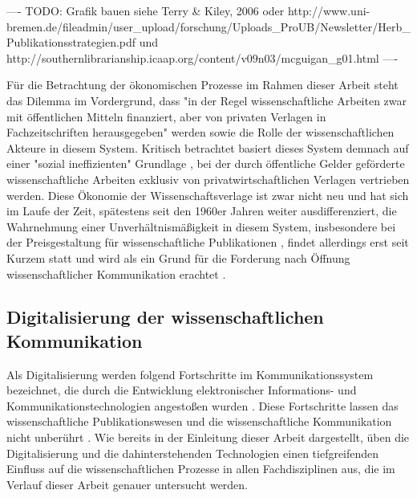 ---- TODO: Grafik bauen siehe Terry & Kiley, 2006 oder http://www.uni-bremen.de/fileadmin/user_upload/forschung/Uploads_ProUB/Newsletter/Herb_Publikationsstrategien.pdf und http://southernlibrarianship.icaap.org/content/v09n03/mcguigan_g01.html ----

Für die Betrachtung der ökonomischen Prozesse im Rahmen dieser Arbeit steht das Dilemma im Vordergrund, dass "in der Regel wissenschaftliche Arbeiten zwar mit öffentlichen Mitteln finanziert, aber von privaten Verlagen in Fachzeitschriften herausgegeben" \cite[:9]{WD_bundestag_2009} werden sowie die Rolle der wissenschaftlichen Akteure in diesem System. Kritisch betrachtet basiert dieses System demnach auf einer "sozial ineffizienten" Grundlage \cite[:47]{mueller-langer_2010}, bei der durch öffentliche Gelder geförderte wissenschaftliche Arbeiten exklusiv von privatwirtschaftlichen Verlagen vertrieben werden. Diese Ökonomie der Wissenschaftsverlage ist zwar nicht neu und hat sich im Laufe der Zeit, spätestens seit den 1960er Jahren weiter ausdifferenziert, die Wahrnehmung einer Unverhältnismäßigkeit in diesem System, insbesondere bei der Preisgestaltung für wissenschaftliche Publikationen \cite{King_2008}, findet allerdings erst seit Kurzem statt \cite{CREATe_2014} und wird als ein Grund für die Forderung nach Öffnung wissenschaftlicher Kommunikation erachtet \cite{yiotis_2013_open} \cite{herb_2010}.

\subsection{Digitalisierung der wissenschaftlichen Kommunikation}

Als Digitalisierung werden folgend Fortschritte im Kommunikationssystem bezeichnet, die durch die Entwicklung elektronischer Informations- und Kommunikationstechnologien angestoßen wurden \cite{bbaw_publizieren_2015}. Diese Fortschritte lassen das wissenschaftliche Publikationswesen und die wissenschaftliche Kommunikation nicht unberührt \cite{naeder_2010_open}. Wie bereits in der Einleitung dieser Arbeit dargestellt, üben die Digitalisierung und die dahinterstehenden Technologien einen tiefgreifenden Einfluss auf die wissenschaftlichen Prozesse in allen Fachdisziplinen aus, die im Verlauf dieser Arbeit genauer untersucht werden.

